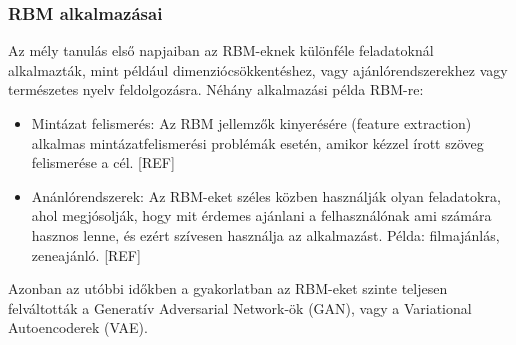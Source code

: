  

\subsubsection{RBM alkalmazásai}

Az mély tanulás első napjaiban az RBM-eknek különféle feladatoknál alkalmazták, mint például dimenziócsökkentéshez, vagy ajánlórendszerekhez vagy természetes nyelv feldolgozásra. Néhány alkalmazási példa RBM-re:
\begin{itemize}
	\item Mintázat felismerés: Az RBM jellemzők kinyerésére (feature extraction) alkalmas mintázatfelismerési problémák esetén, amikor kézzel írott szöveg felismerése a cél. [REF]
	\item Anánlórendszerek: Az RBM-eket széles közben használják olyan feladatokra, ahol megjósolják, hogy mit érdemes ajánlani a felhasználónak ami számára hasznos lenne, és ezért szívesen használja az alkalmazást. Példa: filmajánlás, zeneajánló. [REF]
\end{itemize}

Azonban az utóbbi időkben a gyakorlatban az RBM-eket szinte teljesen felváltották a Generatív Adversarial Network-ök (GAN), vagy a Variational Autoencoderek (VAE).


